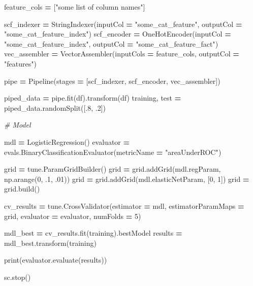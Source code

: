 \documentclass[]{book}
\newenvironment{Shaded}{\begin{snugshade}}{\end{snugshade}}
\newcommand{\BuiltInTok}[1]{#1}
\newcommand{\CommentTok}[1]{\textcolor[rgb]{0.56,0.35,0.01}{\textit{#1}}}
\newcommand{\DecValTok}[1]{\textcolor[rgb]{0.00,0.00,0.81}{#1}}
\newcommand{\FloatTok}[1]{\textcolor[rgb]{0.00,0.00,0.81}{#1}}
\newcommand{\NormalTok}[1]{#1}
\newcommand{\OperatorTok}[1]{\textcolor[rgb]{0.81,0.36,0.00}{\textbf{#1}}}
\newcommand{\StringTok}[1]{\textcolor[rgb]{0.31,0.60,0.02}{#1}}
\begin{document}
\begin{Shaded}
\begin{Highlighting}[]
\NormalTok{feature_cols }\OperatorTok{=}\NormalTok{ [}\StringTok{"some list of column names"}\NormalTok{]}

\NormalTok{scf_indexer }\OperatorTok{=}\NormalTok{ StringIndexer(inputCol }\OperatorTok{=} \StringTok{"some_cat_feature"}\NormalTok{, outputCol }\OperatorTok{=} \StringTok{"some_cat_feature_index"}\NormalTok{)}
\NormalTok{scf_encoder }\OperatorTok{=}\NormalTok{ OneHotEncoder(inputCol }\OperatorTok{=} \StringTok{"some_cat_feature_index"}\NormalTok{, outputCol }\OperatorTok{=} \StringTok{"some_cat_feature_fact"}\NormalTok{)}
\NormalTok{vec_assembler }\OperatorTok{=}\NormalTok{ VectorAssembler(inputCols }\OperatorTok{=}\NormalTok{ feature_cols, outputCol }\OperatorTok{=} \StringTok{"features"}\NormalTok{)}

\NormalTok{pipe }\OperatorTok{=}\NormalTok{ Pipeline(stages }\OperatorTok{=}\NormalTok{ [scf_indexer, scf_encoder, vec_assembler])}

\NormalTok{piped_data }\OperatorTok{=}\NormalTok{ pipe.fit(df).transform(df)}
\NormalTok{training, test }\OperatorTok{=}\NormalTok{ piped_data.randomSplit([.}\DecValTok{8}\NormalTok{, }\FloatTok{.2}\NormalTok{])}

\CommentTok{# Model}

\NormalTok{mdl }\OperatorTok{=}\NormalTok{ LogisticRegression()}
\NormalTok{evaluator }\OperatorTok{=}\NormalTok{ evals.BinaryClassificationEvaluator(metricName }\OperatorTok{=} \StringTok{"areaUnderROC"}\NormalTok{)}

\NormalTok{grid }\OperatorTok{=}\NormalTok{ tune.ParamGridBuilder()}
\NormalTok{grid }\OperatorTok{=}\NormalTok{ grid.addGrid(mdl.regParam, np.arange(}\DecValTok{0}\NormalTok{, }\FloatTok{.1}\NormalTok{, }\FloatTok{.01}\NormalTok{))}
\NormalTok{grid }\OperatorTok{=}\NormalTok{ grid.addGrid(mdl.elasticNetParam, [}\DecValTok{0}\NormalTok{, }\DecValTok{1}\NormalTok{])}
\NormalTok{grid }\OperatorTok{=}\NormalTok{ grid.build()}

\NormalTok{cv_results }\OperatorTok{=}\NormalTok{ tune.CrossValidator(estimator }\OperatorTok{=}\NormalTok{ mdl, estimatorParamMaps }\OperatorTok{=}\NormalTok{ grid,}
\NormalTok{                                 evaluator }\OperatorTok{=}\NormalTok{ evaluator, numFolds }\OperatorTok{=} \DecValTok{5}\NormalTok{)}

\NormalTok{mdl_best }\OperatorTok{=}\NormalTok{ cv_results.fit(training).bestModel}
\NormalTok{results }\OperatorTok{=}\NormalTok{ mdl_best.transform(training)}

\BuiltInTok{print}\NormalTok{(evaluator.evaluate(results))}

\NormalTok{sc.stop()}
\end{Highlighting}
\end{Shaded}
\end{document}
